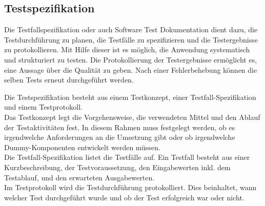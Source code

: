 \subsection{Testspezifikation}  \label{Testspezifikation}

Die Testfallspezifikation oder auch Software Test Dokumentation dient dazu, die Testdurchführung zu planen, die Testfälle 
zu spezifizieren und die Testergebnisse zu protokollieren. Mit Hilfe dieser ist es möglich, die Anwendung systematisch 
und strukturiert zu testen. Die Protokollierung der Testergebnisse ermöglicht es, eine Aussage über die Qualität zu geben.
Nach einer Fehlerbehebung können die selben Tests erneut durchgeführt werden.

Die Testspezifikation besteht aus einem Testkonzept, einer Testfall-Spezifikation und einem Testprotokoll.\\
Das Testkonzept legt die Vorgehensweise, die verwendeten Mittel und den Ablauf der Testaktivitäten fest. In diesem Rahmen
muss festgelegt werden, ob es irgendwelche Anforderungen an die Umsetzung gibt oder ob irgendwelche Dummy-Komponenten 
entwickelt werden müssen.\\
Die Testfall-Spezifikation listet die Testfälle auf. Ein Testfall besteht aus einer Kurzbeschreibung, der Testvoraussetzung, 
den Eingabewerten inkl. dem Testablauf, und den erwarteten Ausgabewerten.\\
Im Testprotokoll wird die Testdurchführung protokolliert. Dies beinhaltet, wann welcher Test durchgeführt wurde und ob 
der Test erfolgreich war oder nicht.